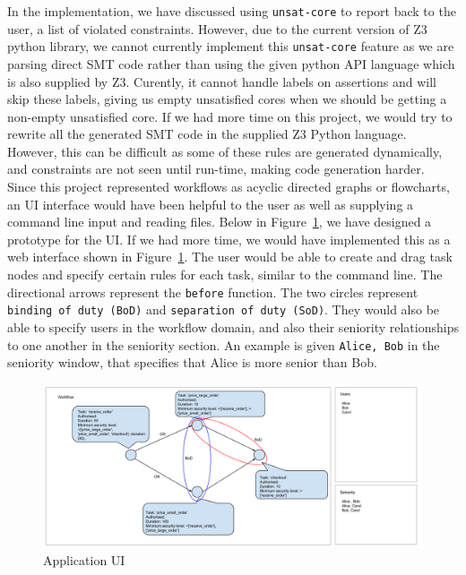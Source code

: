 \documentclass[a4paper]{report}
\begin{document}
In the implementation, we have discussed using \texttt{unsat-core} to report back to the user, a list of violated constraints. However, due to the current version of Z3 python library, we cannot currently implement this \texttt{unsat-core} feature as we are parsing direct SMT code rather than using the given python API language which is also supplied by Z3. Curently, it cannot handle labels on assertions and will skip these labels, giving us empty unsatisfied cores when we should be getting a non-empty unsatisfied core. If we had more time on this project, we would try to rewrite all the generated SMT code in the supplied Z3 Python language. However, this can be difficult as some of these rules are generated dynamically, and constraints are not seen until run-time, making code generation harder. \\

Since this project represented workflows as acyclic directed graphs or flowcharts, an UI interface would have been helpful to the user as well as supplying a command line input and reading files. Below in Figure~\ref{fig:Application UI}, we have designed a prototype for the UI. If we had more time, we would have implemented this as a web interface shown in Figure~\ref{fig:Application UI}. The user would be able to create and drag task nodes and specify certain rules for each task, similar to the command line. The directional arrows represent the \texttt{before} function. The two circles represent \texttt{binding of duty (BoD)} and \texttt{separation of duty (SoD)}. They would also be able to specify users in the workflow domain, and also their seniority relationships to one another in the seniority section. An example is given \texttt{Alice, Bob} in the seniority window, that specifies that Alice is more senior than Bob.

\begin{figure}
\includegraphics[scale=0.35, angle=90,origin=c]{ui.png}
\caption{Application UI}
\label{fig:Application UI}
\end{figure}
\end{document}
